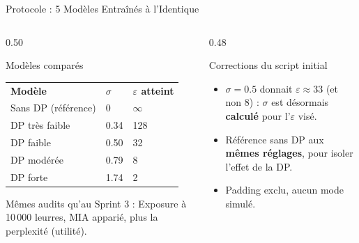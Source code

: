 \begin{frame}{Protocole : 5 Modèles Entraînés à l'Identique}
    \begin{columns}[T]
        \begin{column}{0.50\textwidth}
            \begin{block}{Modèles comparés}
                \renewcommand{\arraystretch}{1.05}
                {\footnotesize
                \begin{tabularx}{\textwidth}{l X X}
                    \rowcolor{TSPblue}\color{white}\textbf{Modèle} & \color{white}\textbf{$\sigma$} & \color{white}\textbf{$\varepsilon$ atteint} \\
                    Sans DP (référence) & 0 & $\infty$ \\
                    \rowcolor{TSPgrey} DP très faible & 0.34 & 128 \\
                    DP faible & 0.50 & 32 \\
                    \rowcolor{TSPgrey} DP modérée & 0.79 & 8 \\
                    DP forte & 1.74 & 2 \\
                \end{tabularx}
                }
            \end{block}
            {\footnotesize Mêmes audits qu'au Sprint 3 : Exposure à 10\,000 leurres, MIA apparié, plus la perplexité (utilité).\par}
        \end{column}
        \begin{column}{0.48\textwidth}
            \begin{alertblock}{Corrections du script initial}
                \footnotesize
                \begin{itemize}
                    \item $\sigma = 0.5$ donnait $\varepsilon \approx 33$ (et non 8) : $\sigma$ est désormais \textbf{calculé} pour l'$\varepsilon$ visé.
                    \item Référence sans DP aux \textbf{mêmes réglages}, pour isoler l'effet de la DP.
                    \item Padding exclu, aucun mode simulé.
                \end{itemize}
            \end{alertblock}
        \end{column}
    \end{columns}
\end{frame}

